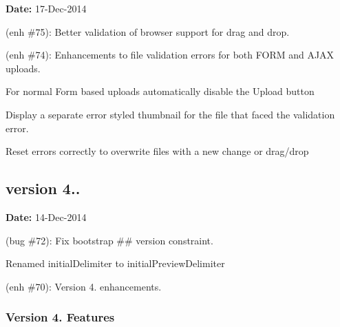 {\bfseries Date\+:} 17-\/\+Dec-\/2014


\begin{DoxyItemize}
\item (enh \#75)\+: Better validation of browser support for drag and drop.
\item (enh \#74)\+: Enhancements to file validation errors for both F\+O\+RM and A\+J\+AX uploads.
\begin{DoxyItemize}
\item For normal Form based uploads automatically disable the Upload button
\item Display a separate error styled thumbnail for the file that faced the validation error.
\item Reset errors correctly to overwrite files with a new change or drag/drop
\end{DoxyItemize}
\end{DoxyItemize}

\subsection*{version 4..}

{\bfseries Date\+:} 14-\/\+Dec-\/2014


\begin{DoxyItemize}
\item (bug \#72)\+: Fix bootstrap \#\# version constraint.
\item Renamed {\ttfamily initial\+Delimiter} to {\ttfamily initial\+Preview\+Delimiter}
\item (enh \#70)\+: Version 4. enhancements.
\end{DoxyItemize}

\subsubsection*{Version 4. Features}


